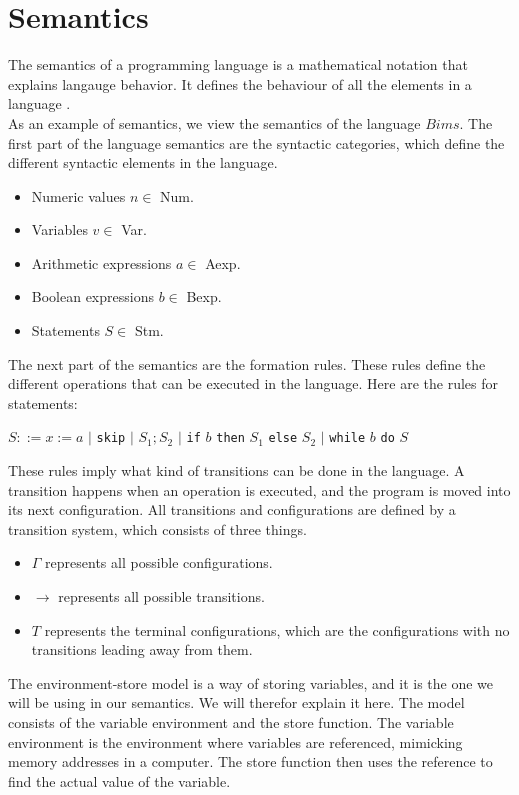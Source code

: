 \section{Semantics}
\label{sec:semantics}

The semantics of a programming language is a mathematical notation that explains langauge behavior. 
It defines the behaviour of all the elements in a language \cite{misc:sem}.\\ \indent
As an example of semantics, we view the semantics of the language $Bims$. 
The first part of the language semantics are the syntactic categories, which define the different syntactic elements in the language.

\begin{itemize}
\item Numeric values $n \in$ Num.
\item Variables $v \in$ Var.
\item Arithmetic expressions $a \in$ Aexp.
\item Boolean expressions $b \in$ Bexp.
\item Statements $S \in$ Stm.
\end{itemize}

The next part of the semantics are the formation rules. 
These rules define the different operations that can be executed in the language. 
Here are the rules for statements: \newline

$S ::= x := a$ $|$ \texttt{skip} $|$ $S_1;S_2$ $|$ \texttt{if} $b$ \texttt{then} $S_1$ \texttt{else} $S_2$ $|$ \texttt{while} $b$ \texttt{do} $S$\newline

These rules imply what kind of transitions can be done in the language. 
A transition happens when an operation is executed, and the program is moved into its next configuration. 
All transitions and configurations are defined by a transition system, which consists of three things. 

\begin{itemize}
\item $\Gamma$ represents all possible configurations. 
\item $\rightarrow$ represents all possible transitions.
\item $T$ represents the terminal configurations, which are the configurations with no transitions leading away from them.
\end{itemize}

The environment-store model is a way of storing variables, and it is the one we will be using in our semantics. 
We will therefor explain it here. \newline
The model consists of the variable environment and the store function. 
The variable environment is the environment where variables are referenced, mimicking memory addresses in a computer. 
The store function then uses the reference to find the actual value of the variable. \newline

